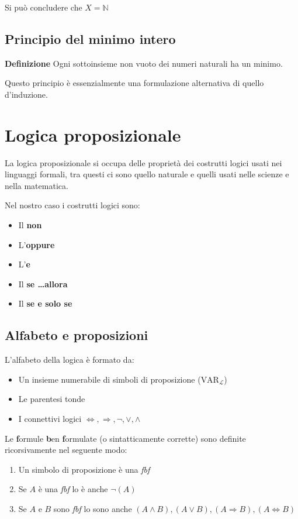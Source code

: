 \documentclass{article}
\begin{document}
\noindent Si può concludere che $X=\mathbb{N}$

\subsection{Principio del minimo intero}

\textbf{Definizione} Ogni sottoinsieme non vuoto dei numeri naturali ha un minimo.\newline

\noindent Questo principio è essenzialmente una formulazione alternativa di quello d'induzione.
 
\section{Logica proposizionale}

La logica proposizionale si occupa delle proprietà dei costrutti logici usati nei linguaggi formali, tra questi ci sono quello naturale e quelli usati nelle scienze e nella matematica.\newline

\noindent Nel nostro caso i costrutti logici sono:
\begin{itemize}
    \item Il \textbf{non}
    \item L'\textbf{oppure}
    \item L'\textbf{e}
    \item Il \textbf{se \ldots allora}
    \item Il \textbf{se e solo se}
\end{itemize}

\subsection{Alfabeto e proposizioni}

L'alfabeto della logica è formato da:
\begin{itemize}
    \item Un insieme numerabile di simboli di proposizione ($\text{VAR}_\mathcal{L}$)
    \item Le parentesi tonde
    \item I connettivi logici $\iff,\Rightarrow,\neg,\lor,\land$\newline
\end{itemize}

\newpage

\noindent Le \textbf{f}ormule \textbf{b}en \textbf{f}ormulate (o sintatticamente corrette) sono definite ricorsivamente nel seguente modo:
\begin{enumerate}
    \item Un simbolo di proposizione è una \textit{fbf}
    \item Se $A$ è una \textit{fbf} lo è anche $\neg(A)$
    \item Se $A$ e $B$ sono \textit{fbf} lo sono anche $(A\land B),(A\lor B),(A\Rightarrow B),(A\iff B)$
\end{enumerate}
\end{document}
